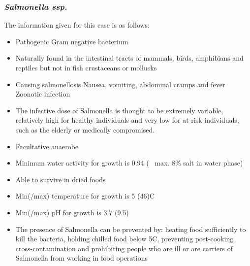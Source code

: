 \subsubsection{\textit{Salmonella ssp.}}
\begin{highlight}
    The information given for this case is as follows:

\begin{itemize}
\item Pathogenic Gram negative bacterium
\item Naturally found in the intestinal tracts of mammals, birds, amphibians and reptiles but not in fish crustaceans or mollusks
\item Causing salmonellosis
\subitem Nausea, vomiting, abdominal cramps and fever 
\subitem Zoonotic infection
\item The infective dose of Salmonella is thought to be extremely variable, relatively high for healthy individuals and very low for at-risk individuals, such as the elderly or medically compromised.
\item Facultative anaerobe
\item Minimum water activity for growth is 0.94
\subitem (~ max. 8\% salt in water phase)
\item Able to survive in dried foods
\item Min(/max) temperature for growth is 5 (46)\textdegree C
\item Min(/max) pH for growth is 3.7 (9.5)
\item The presence of Salmonella can be prevented by: heating food sufficiently to kill the bacteria, holding chilled food below 5\textdegree C, preventing post-cooking cross-contamination and prohibiting people who are ill or are carriers of Salmonella from working in food operations

\end{itemize}
\end{highlight}

